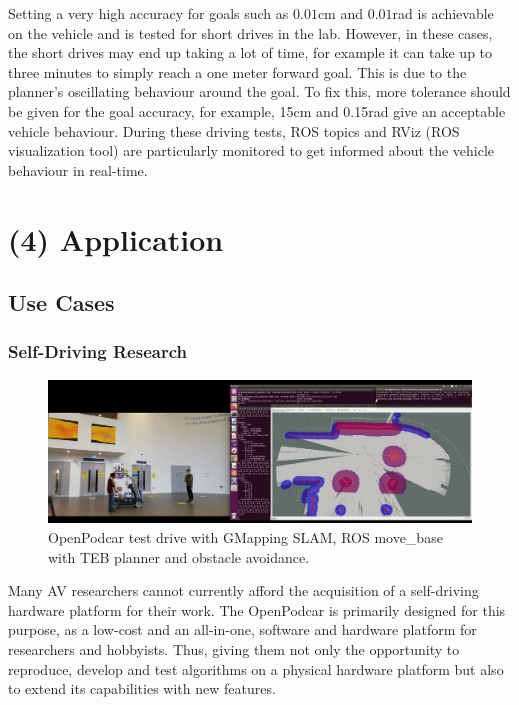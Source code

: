 \documentclass[a4paper]{article}
\begin{document}
	Setting a very high accuracy for goals such as $0.01$cm and $0.01$rad is achievable on the vehicle and is tested for short drives in the lab. However, in these cases, the short drives may end up taking a lot of time, for example it can take up to three minutes to simply reach a one meter forward goal. This is due to the planner's oscillating behaviour around the goal. To fix this, more tolerance should be given for the goal accuracy, for example, 15cm and 0.15rad give an acceptable vehicle behaviour. During these driving tests, ROS topics and RViz (ROS visualization tool) are particularly monitored to get informed about the vehicle behaviour in real-time. 
	
	
	
	\section{(4) Application}\label{h.f78bi3oom0mu}
	
	\subsection{Use Cases}
	
	\subsubsection{Self-Driving  Research}\label{h.4q5g9edishy3}
	
	\begin{figure}
		\centering
		\includegraphics[width=\columnwidth]{software/move_base_collision_avoidance.png}
		\caption{OpenPodcar test drive with GMapping SLAM, ROS move\_base with TEB planner and obstacle avoidance.}
		\label{fig:testDrive_gmapping}
	\end{figure}
	
	Many AV researchers cannot currently afford the acquisition of a self-driving hardware platform for their work. The OpenPodcar is primarily designed for this purpose, as a low-cost and an all-in-one, software and hardware platform for researchers and hobbyists. Thus, giving them not only the opportunity to reproduce, develop and test algorithms on a physical hardware platform but also to extend its capabilities with new features. 
	
\end{document}
